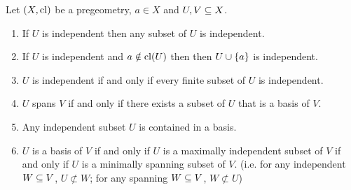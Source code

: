\begin{prop}
    Let $(X,\operatorname{cl})$ be a pregeometry, $a \in X$ and $U,V \subseteq X$.
    \begin{enumerate}
        \item If $U$ is independent then any subset of $U$ is independent.
        \item If $U$ is independent and $a \notin \operatorname{cl}(U)$ then then 
            $U \cup \left\{a\right\}$ is independent.
        \item $U$ is independent if and only if every finite subset of $U$ is 
            independent.
        \item $U$ spans $V$ if and only if there exists a subset of 
            $U$ that is a basis of $V$. 
        \item Any independent subset $U$ is contained in a basis.
        \item $U$ is a basis of $V$ if and only if $U$ 
            is a maximally independent subset of $V$
            if and only if $U$ is a minimally spanning subset of $V$.
            (i.e. for any independent $W \subseteq V$, $U \not\subset W$;
            for any spanning $W \subseteq V$, $W \not\subset U$)
    \end{enumerate}
\end{prop}
